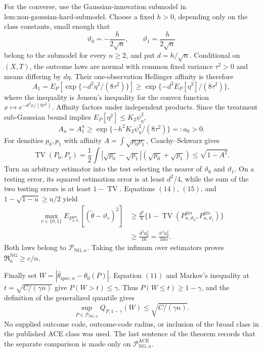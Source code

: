 For the converse, use the Gaussian-innovation submodel in \(\text{lem:non-gaussian-hard-submodel}\).  Choose a fixed \(h>0\), depending only on the class constants, small enough that
\[
 \vartheta_0=-\frac{h}{2\sqrt n},
 \qquad
 \vartheta_1=\frac{h}{2\sqrt n}
\]
belong to the submodel for every \(n\ge2\), and put \(d=h/\sqrt n\).  Conditional on \((X,T)\), the outcome laws are normal with common fixed variance \(\tau^2>0\) and means differing by \(d\eta\).  Their one-observation Hellinger affinity is therefore
\[
 A_1
 =E_P\!\left[\exp\{-d^2\eta^2/(8\tau^2)\}\right]
 \ge\exp\{-d^2E_P[\eta^2]/(8\tau^2)\}, \tag{13}
\]
where the inequality is Jensen's inequality for the convex function \(x\mapsto e^{-d^2x/(8\tau^2)}\).  Affinity factors under independent products.  Since the treatment sub-Gaussian bound implies \(E_P[\eta^2]\le K_2\psi_\eta^2\),
\[
 A_n=A_1^n
 \ge\exp\{-h^2K_2\psi_\eta^2/(8\tau^2)\}
 =:a_0>0. \tag{14}
\]
For densities \(p_0,p_1\) with affinity \(A=\int\sqrt{p_0p_1}\), Cauchy--Schwarz gives
\[
 \operatorname{TV}(P_0,P_1)
 =\frac12\int|\sqrt{p_0}-\sqrt{p_1}|
                  (\sqrt{p_0}+\sqrt{p_1})
 \le\sqrt{1-A^2}. \tag{15}
\]
Turn an arbitrary estimator into the test selecting the nearer of \(\vartheta_0\) and \(\vartheta_1\).  On a testing error, its squared estimation error is at least \(d^2/4\), while the sum of the two testing errors is at least \(1-\operatorname{TV}\).  Equations \((14)\), \((15)\), and \(1-\sqrt{1-u}\ge u/2\) yield
\[
 \begin{aligned}
 \max_{v\in\{0,1\}}
 E_{P_{n,\vartheta_v}^{\otimes n}}
 [ (\widetilde\theta-\vartheta_v)^2 ]
 &\ge\frac{d^2}{8}
   \{1-\operatorname{TV}(P_{n,\vartheta_0}^{\otimes n},
                          P_{n,\vartheta_1}^{\otimes n})\}\\
 &\ge\frac{d^2a_0^2}{16}
 =\frac{h^2a_0^2}{16n}. \tag{16}
 \end{aligned}
\]
Both laws belong to \(\mathcal P_{\mathrm{NG},n}\).  Taking the infimum over estimators proves \(\mathfrak R_n^{\mathrm{NG}}\ge c/n\).

Finally set \(W=|\widehat\theta_{\mathrm{spec},n}-\theta_0(P)|\).  Equation \((11)\) and Markov's inequality at \(t=\sqrt{C/(\gamma n)}\) give \(P(W>t)\le\gamma\).  Thus \(P(W\le t)\ge1-\gamma\), and the definition of the generalized quantile gives
\[
 \sup_{P\in\mathcal P_{\mathrm{NG},n}}
 Q_{P,1-\gamma}(W)
 \le\sqrt{C/(\gamma n)}.
\]
No supplied outcome code, outcome-code radius, or inclusion of the broad class in the published ACE class was used.  The last sentence of the theorem records that the separate comparison is made only on \(\mathcal P_{\mathrm{NG},n}^{\mathrm{ACE}}\).